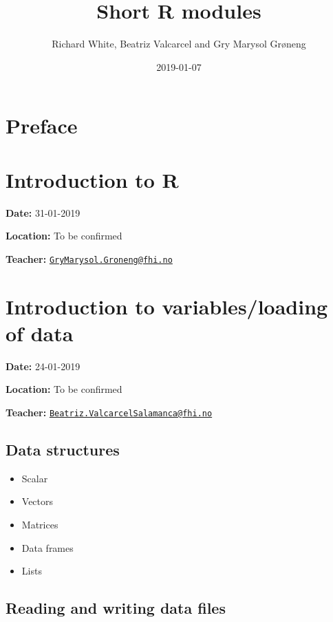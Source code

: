\documentclass[12pt,]{article}
\title{Short R modules}
\author{Richard White, Beatriz Valcarcel and Gry Marysol Grøneng}
\date{2019-01-07}
\providecommand{\tightlist}{%
  \setlength{\itemsep}{0pt}\setlength{\parskip}{0pt}}
\begin{document}
\maketitle

{
\hypersetup{linkcolor=black}
\setcounter{tocdepth}{2}
\tableofcontents
}
\listoftables
\listoffigures
\section*{Preface}\label{preface}

\section{Introduction to R}\label{introduction-to-r}

\textbf{Date:} 31-01-2019

\textbf{Location:} To be confirmed

\textbf{Teacher:}
\href{mailto:GryMarysol.Groneng@fhi.no}{\nolinkurl{GryMarysol.Groneng@fhi.no}}

\section{Introduction to variables/loading of
data}\label{introduction-to-variablesloading-of-data}

\textbf{Date:} 24-01-2019

\textbf{Location:} To be confirmed

\textbf{Teacher:}
\href{mailto:Beatriz.ValcarcelSalamanca@fhi.no}{\nolinkurl{Beatriz.ValcarcelSalamanca@fhi.no}}

\subsection{Data structures}\label{data-structures}

\begin{itemize}
\tightlist
\item
  Scalar
\item
  Vectors
\item
  Matrices
\item
  Data frames
\item
  Lists
\end{itemize}

\subsection{Reading and writing data
files}\label{reading-and-writing-data-files}
\end{document}
